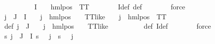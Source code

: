 \begin{isabellebody}
\ \ \ \ \isamarkupfalse%
\ {\isachardoublequoteopen}{\isasymforall}{\isasympsi}\ {\isasymin}\ {\isasymPsi}\ {\isacharbackquote}{\kern0pt}\ I{\isacharprime}{\kern0pt}{\isachardot}{\kern0pt}\ {\isasymexists}{\isasymalpha}{\isachardot}{\kern0pt}\ {\isasympsi}\ {\isacharequal}{\kern0pt}\ hml{\isacharunderscore}{\kern0pt}pos\ {\isasymalpha}\ TT{\isachardoublequoteclose}\isanewline
\ \ \ \ \ \ \isamarkupfalse%
\ I{\isacharprime}{\kern0pt}{\isacharunderscore}{\kern0pt}def\ {\isasymPsi}{\isacharunderscore}{\kern0pt}def\isanewline
\ \ \ \ \ \ \isamarkupfalse%
\ force\isanewline
\ \ \ \ \isamarkupfalse%
\ {\isachardoublequoteopen}{\isasymforall}j\ {\isasymin}\ {\isacharparenleft}{\kern0pt}J\ {\isasymunion}\ I{\isacharprime}{\kern0pt}{\isacharparenright}{\kern0pt}{\isachardot}{\kern0pt}\ {\isasymexists}{\isasymalpha}\ {\isasymchi}{\isachardot}{\kern0pt}\ {\isasymPhi}\ j\ {\isacharequal}{\kern0pt}\ hml{\isacharunderscore}{\kern0pt}pos\ {\isasymalpha}\ {\isasymchi}\ {\isasymand}\ TT{\isacharunderscore}{\kern0pt}like\ {\isasymchi}\ {\isasymand}\ {\isasymPsi}\ j\ {\isacharequal}{\kern0pt}\ hml{\isacharunderscore}{\kern0pt}pos\ {\isasymalpha}\ TT{\isachardoublequoteclose}\ \isanewline
\ \ \ \ \ \ \isamarkupfalse%
\ {\isasymPsi}{\isacharunderscore}{\kern0pt}def\ {\isacartoucheopen}{\isasymforall}j\ {\isasymin}\ J{\isachardot}{\kern0pt}\ {\isacharparenleft}{\kern0pt}{\isasymexists}{\isasymalpha}\ {\isasymchi}{\isachardot}{\kern0pt}\ {\isasymPhi}\ j\ {\isacharequal}{\kern0pt}\ hml{\isacharunderscore}{\kern0pt}pos\ {\isasymalpha}\ {\isasymchi}\ {\isasymand}\ TT{\isacharunderscore}{\kern0pt}like\ {\isasymchi}{\isacharparenright}{\kern0pt}{\isacartoucheclose}\ \isanewline
\ \ \ \ \ \ \isamarkupfalse%
\ {\isasymPsi}{\isacharunderscore}{\kern0pt}def\ I{\isacharprime}{\kern0pt}{\isacharunderscore}{\kern0pt}def\isanewline
\ \ \ \ \ \ \isamarkupfalse%
\ force\isanewline
\ \ \ \ \isamarkupfalse%
\ {\isachardoublequoteopen}{\isacharparenleft}{\kern0pt}{\isasymforall}s{\isachardot}{\kern0pt}\ {\isasymforall}j\ {\isasymin}\ J\ {\isasymunion}\ I{\isacharprime}{\kern0pt}{\isachardot}{\kern0pt}\ {\isacharparenleft}{\kern0pt}{\isasymnot}{\isacharparenleft}{\kern0pt}s\ {\isasymTurnstile}\ {\isacharparenleft}{\kern0pt}{\isasymPsi}\ j{\isacharparenright}{\kern0pt}{\isacharparenright}{\kern0pt}\ {\isacharequal}{\kern0pt}\ {\isacharparenleft}{\kern0pt}{\isasymnot}{\isacharparenleft}{\kern0pt}s\ {\isasymTurnstile}\ {\isacharparenleft}{\kern0pt}{\isasymPhi}\ j{\isacharparenright}{\kern0pt}{\isacharparenright}{\kern0pt}{\isacharparenright}{\kern0pt}{\isacharparenright}{\kern0pt}{\isacharparenright}{\kern0pt}{\isachardoublequoteclose}\ \isanewline

\end{isabellebody}
